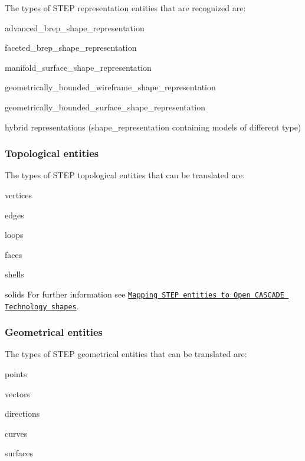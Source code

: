 The types of S\+T\+EP representation entities that are recognized are\+:
\begin{DoxyItemize}
\item advanced\+\_\+brep\+\_\+shape\+\_\+representation
\item faceted\+\_\+brep\+\_\+shape\+\_\+representation
\item manifold\+\_\+surface\+\_\+shape\+\_\+representation
\item geometrically\+\_\+bounded\+\_\+wireframe\+\_\+shape\+\_\+representation
\item geometrically\+\_\+bounded\+\_\+surface\+\_\+shape\+\_\+representation
\item hybrid representations (shape\+\_\+representation containing models of different type)
\end{DoxyItemize}\hypertarget{occt_user_guides__step_occt_step_2_2_3}{}\subsubsection{Topological entities}\label{occt_user_guides__step_occt_step_2_2_3}
The types of S\+T\+EP topological entities that can be translated are\+:
\begin{DoxyItemize}
\item vertices
\item edges
\item loops
\item faces
\item shells
\item solids For further information see \href{#occt_step_2_4}{\tt Mapping S\+T\+EP entities to Open C\+A\+S\+C\+A\+DE Technology shapes}.
\end{DoxyItemize}\hypertarget{occt_user_guides__step_occt_step_2_2_4}{}\subsubsection{Geometrical entities}\label{occt_user_guides__step_occt_step_2_2_4}
The types of S\+T\+EP geometrical entities that can be translated are\+:
\begin{DoxyItemize}
\item points
\item vectors
\item directions
\item curves
\item surfaces
\end{DoxyItemize}

